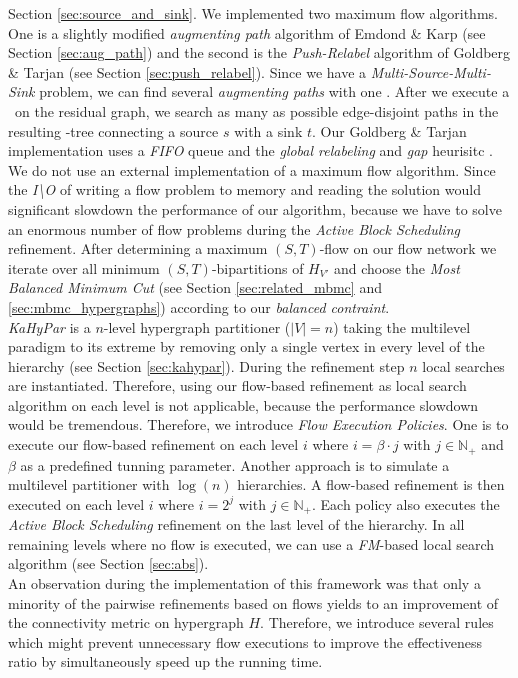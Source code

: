 Section \ref{sec:source_and_sink}. We implemented two maximum flow algorithms.
One is a slightly modified \emph{augmenting path} algorithm of Emdond \& Karp
\cite{edmonds1972theoretical} (see Section \ref{sec:aug_path}) 
and the second is the \emph{Push-Relabel} algorithm of
Goldberg \& Tarjan \cite{cherkassky1997implementing,goldberg1988new} 
(see Section \ref{sec:push_relabel}). Since we have a 
\emph{Multi-Source-Multi-Sink} problem, we can find several \emph{augmenting paths}
with one \BFS. After we execute a \BFS~on the residual graph, we search 
as many as possible edge-disjoint paths in the resulting \BFS-tree connecting a source $s$
with a sink $t$. Our Goldberg \& Tarjan implementation uses a \emph{FIFO} queue and
the \emph{global relabeling} and \emph{gap} heurisitc \cite{cherkassky1997implementing}.
We do not use an external implementation of a maximum flow algorithm.
Since the \emph{I\textbackslash O} of writing a flow problem to memory and reading the
solution would significant slowdown the performance of our algorithm, because we have
to solve an enormous number of flow problems during the \emph{Active Block Scheduling}
refinement. After determining a maximum $(S,T)$-flow on our flow network we iterate over
all minimum $(S,T)$-bipartitions of $H_{V'}$ \cite{picard1980structure} and choose 
the \emph{Most Balanced Minimum Cut} (see Section \ref{sec:related_mbmc} and 
\ref{sec:mbmc_hypergraphs}) according to our \emph{balanced contraint}. \\
\emph{KaHyPar} is a $n$-level hypergraph partitioner ($|V| = n$) taking the 
multilevel paradigm to its extreme by removing only a single vertex in every level
of the hierarchy \cite{akhremtsev2017engineering} (see Section \ref{sec:kahypar}). 
During the refinement step $n$ local searches are instantiated. Therefore, 
using our flow-based refinement as local search algorithm on each level is not 
applicable, because the performance slowdown would be tremendous. Therefore,
we introduce \emph{Flow Execution Policies}. One is to execute our flow-based
refinement on each level $i$ where $i = \beta\cdot j$ with $j \in \mathbb{N}_+$ and
$\beta$ as a predefined tunning parameter. Another approach is to simulate a
multilevel partitioner with $\log(n)$ hierarchies. A flow-based refinement is then
executed on each level $i$ where $i = 2^j$ with $j \in \mathbb{N}_+$. Each policy also
executes the \emph{Active Block Scheduling} refinement on the last level of the
hierarchy. In all remaining levels where no flow is executed, we can use a 
\emph{FM}-based local search algorithm 
\cite{akhremtsev2017engineering,fiduccia1988linear,sanchis1989multiple} (see Section 
\ref{sec:abs}). \\
An observation during the implementation of this framework was that only a minority
of the pairwise refinements based on flows yields to an improvement of the connectivity
metric on hypergraph $H$. Therefore, we introduce several rules which might prevent
unnecessary flow executions to improve the effectiveness ratio by simultaneously speed up
the running time.


